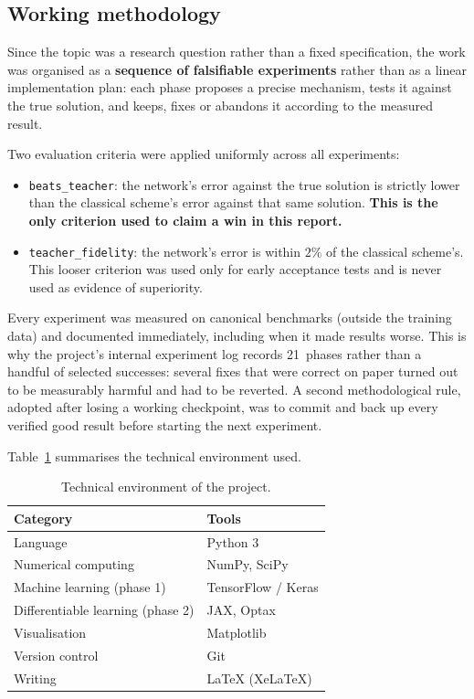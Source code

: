 \documentclass[12pt,a4paper,oneside]{report}
\begin{document}
\subsection*{Working methodology}

Since the topic was a research question rather than a fixed specification, the
work was organised as a \textbf{sequence of falsifiable experiments} rather
than as a linear implementation plan: each phase proposes a precise mechanism,
tests it against the true solution, and keeps, fixes or abandons it according
to the measured result.

Two evaluation criteria were applied uniformly across all experiments:

\begin{itemize}
  \item \texttt{beats\_teacher}: the network's error against the true solution
  is strictly lower than the classical scheme's error against that same
  solution. \textbf{This is the only criterion used to claim a win in this
  report.}
  \item \texttt{teacher\_fidelity}: the network's error is within $2\%$ of the
  classical scheme's. This looser criterion was used only for early acceptance
  tests and is never used as evidence of superiority.
\end{itemize}

Every experiment was measured on canonical benchmarks (outside the training
data) and documented immediately, including when it made results worse. This is
why the project's internal experiment log records 21~phases rather than a
handful of selected successes: several fixes that were correct on paper turned
out to be measurably harmful and had to be reverted. A second methodological
rule, adopted after losing a working checkpoint, was to commit and back up
every verified good result before starting the next experiment.

Table~\ref{tab:tools} summarises the technical environment used.

\begin{table}[H]
\centering
\begin{tabularx}{\textwidth}{@{}lX@{}}
\toprule
\textbf{Category} & \textbf{Tools} \\
\midrule
Language & Python 3 \\
\rowrule
Numerical computing & NumPy, SciPy \\
\rowrule
Machine learning (phase 1) & TensorFlow / Keras \\
\rowrule
Differentiable learning (phase 2) & JAX, Optax \\
\rowrule
Visualisation & Matplotlib \\
\rowrule
Version control & Git \\
\rowrule
Writing & \LaTeX{} (XeLaTeX) \\
\bottomrule
\end{tabularx}
\caption{Technical environment of the project.}
\label{tab:tools}
\end{table}
\end{document}
